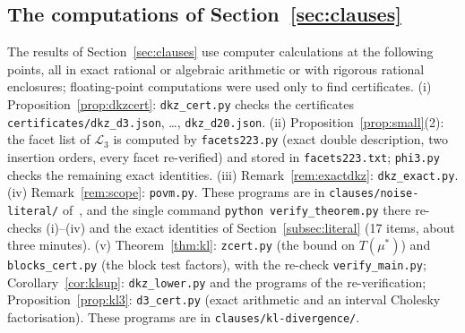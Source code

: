 \documentclass[11pt]{amsart}
\theoremstyle{definition}
\theoremstyle{remark}
\numberwithin{equation}{section}
\newcommand{\cL}{\mathcal{L}}
\begin{document}
\subsection{The computations of Section~\ref{sec:clauses}}\label{subsec:clausecomp}
The results of Section~\ref{sec:clauses} use computer calculations at the following points, all in exact rational or
algebraic arithmetic or with rigorous rational enclosures; floating-point computations were used only to find
certificates. (i) Proposition~\ref{prop:dkzcert}: \texttt{dkz\_cert.py} checks the certificates
\texttt{certificates/dkz\_d3.json}, \dots, \texttt{dkz\_d20.json}. (ii) Proposition~\ref{prop:small}(2): the facet list
of $\cL_3$ is computed by \texttt{facets223.py} (exact double description, two insertion orders, every facet
re-verified) and stored in \texttt{facets223.txt}; \texttt{phi3.py} checks the remaining exact identities. (iii)
Remark~\ref{rem:exactdkz}: \texttt{dkz\_exact.py}. (iv) Remark~\ref{rem:scope}: \texttt{povm.py}. These programs are in
\texttt{clauses/noise-literal/} of~\cite{repo-oqp27}, and the single command \texttt{python
verify\_theorem.py} there re-checks (i)--(iv) and the exact identities of Section~\ref{subsec:literal} (17 items, about
three minutes). (v) Theorem~\ref{thm:kl}: \texttt{zcert.py} (the bound on $T(\mu^*)$) and \texttt{blocks\_cert.py} (the
block test factors), with the re-check \texttt{verify\_main.py}; Corollary~\ref{cor:klsup}: \texttt{dkz\_lower.py}
and the programs of the re-verification; Proposition~\ref{prop:kl3}: \texttt{d3\_cert.py} (exact arithmetic
and an interval Cholesky factorisation). These programs are in \texttt{clauses/kl-divergence/}.
\end{document}
